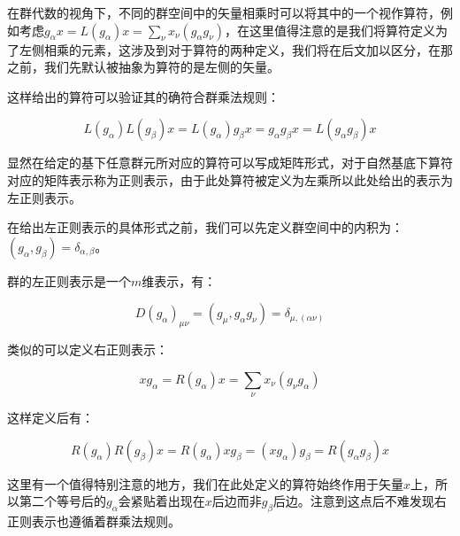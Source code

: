 在群代数的视角下，不同的群空间中的矢量相乘时可以将其中的一个视作算符，例如考虑$g_\alpha x=L(g_\alpha)x=\displaystyle\sum_\nu x_\nu (g_\alpha g_\nu)$，在这里值得注意的是我们将算符定义为了左侧相乘的元素，这涉及到对于算符的两种定义，我们将在后文加以区分，在那之前，我们先默认被抽象为算符的是左侧的矢量。

这样给出的算符可以验证其的确符合群乘法规则：

$$L(g_\alpha)L(g_\beta)x=L(g_\alpha)g_\beta x=g_\alpha g_\beta x=L(g_\alpha g_\beta)x$$

显然在给定的基下任意群元所对应的算符可以写成矩阵形式，对于自然基底下算符对应的矩阵表示称为正则表示，由于此处算符被定义为左乘所以此处给出的表示为左正则表示。

在给出左正则表示的具体形式之前，我们可以先定义群空间中的内积为：$(g_\alpha,g_\beta)=\delta_{\alpha,\beta}$。

群的左正则表示是一个$m$维表示，有：

$$D(g_\alpha)_{\mu\nu}=(g_\mu,g_\alpha g_\nu)=\delta_{\mu,(\alpha\nu)}$$

类似的可以定义右正则表示：

$$x g_\alpha=R(g_\alpha)x=\displaystyle\sum_\nu x_\nu (g_\nu g_\alpha)$$

这样定义后有：

$$R(g_\alpha)R(g_\beta)x=R(g_\alpha)x g_\beta= (x g_\alpha) g_\beta=R(g_\alpha g_\beta)x$$

这里有一个值得特别注意的地方，我们在此处定义的算符始终作用于矢量$x$上，所以第二个等号后的$g_\alpha$会紧贴着出现在$x$后边而非$g_\beta$后边。注意到这点后不难发现右正则表示也遵循着群乘法规则。